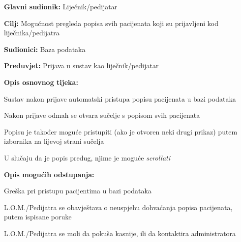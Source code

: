 					\noindent {}
					\begin{packed_item}
						
						\item \textbf{Glavni sudionik: }Liječnik/pedijatar
						\item  \textbf{Cilj:} Mogućnost pregleda popisa svih pacijenata koji su prijavljeni kod liječnika/pedijatra
						\item  \textbf{Sudionici:} Baza podataka
						\item  \textbf{Preduvjet:} Prijava u sustav kao liječnik/pedijatar
						\item  \textbf{Opis osnovnog tijeka:}
						
						\item[] \begin{packed_enum}
							\item Sustav nakon prijave automatski pristupa popisu pacijenata u bazi podataka
							\item Nakon prijave odmah se otvara sučelje s popisom svih pacijenata
							\item Popisu je također moguće pristupiti (ako je otvoren neki drugi prikaz) putem izbornika na lijevoj strani sučelja
							\item U slučaju da je popis predug, njime je moguće \textit{scrollati}
						\end{packed_enum}
						\item  \textbf{Opis mogućih odstupanja:}
						\item[] \begin{packed_item}
							
							\item[1.a] Greška pri pristupu pacijentima u bazi podataka
							\item[] \begin{packed_enum}
								
								\item L.O.M./Pedijatra se obavještava o neuspjehu dohvaćanja popisa pacijenata, putem ispisane poruke
								\item L.O.M./Pedijatra se moli da pokuša kasnije, ili da kontaktira administratora
								
							\end{packed_enum}
						\end{packed_item}
					\end{packed_item}
					
